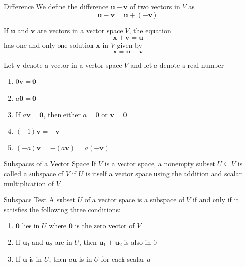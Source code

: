 \documentclass[12pt]{article}
\begin{document}
\begin{definition}{Difference}{}
    We define the difference $ \mathbf{u} - \mathbf{v} $ of two vectors in $ V $ as
    \[ \mathbf{u} - \mathbf{v} = \mathbf{u} + \left( -\mathbf{v} \right) \]
\end{definition}

\begin{theorem}{}{}
    If $ \mathbf{u} $ and $ \mathbf{v} $ are vectors in a vector space $ V $, the equation
    \[ \mathbf{x} + \mathbf{v} = \mathbf{u} \]
    has one and only one solution $ \mathbf{x} $ in $ V $ given by
    \[ \mathbf{x} = \mathbf{u} - \mathbf{v} \]
\end{theorem}

\begin{theorem}{}{}
    Let $ \mathbf{v} $ denote a vector in a vector space $ V $ and let $ a $ denote a real number
    \begin{enumerate}[label=(\roman*)]
        \item $ 0 \mathbf{v} = \mathbf{0} $
        \item $ a \mathbf{0} = \mathbf{0} $
        \item If $ a \mathbf{v} = \mathbf{0} $, then either $ a = 0 $ or $ \mathbf{v} = \mathbf{0} $
        \item $ \left( -1 \right) \mathbf{v} = -\mathbf{v} $
        \item $ \left( -a \right) \mathbf{v} = - \left( a \mathbf{v} \right) = a \left( -\mathbf{v} \right) $
    \end{enumerate}
\end{theorem}

\begin{definition}{Subspaces of a Vector Space}{}
    If $ V $ is a vector space, a nonempty subset $ U \subseteq V $ is called a subspace of $ V $ if $ U $ is itself a vector space using the addition and scalar multiplication of $ V $.
\end{definition}

\begin{theorem}{Subspace Test}{}
    A subset $ U $ of a vector space is a subspace of $ V $ if and only if it satisfies the following three conditions:
    \begin{enumerate}[label=(\roman*)]
        \item $ \mathbf{0} $ lies in $ U $ where $ \mathbf{0} $ is the zero vector of $ V $
        \item If $ \mathbf{u}_1 $ and $ \mathbf{u}_2 $ are in $ U $, then $ \mathbf{u}_1 + \mathbf{u}_2 $ is also in $ U $
        \item If $ \mathbf{u} $ is in $ U $, then $ a \mathbf{u} $ is in $ U $ for each scalar $ a $
    \end{enumerate}
\end{theorem}
\end{document}
